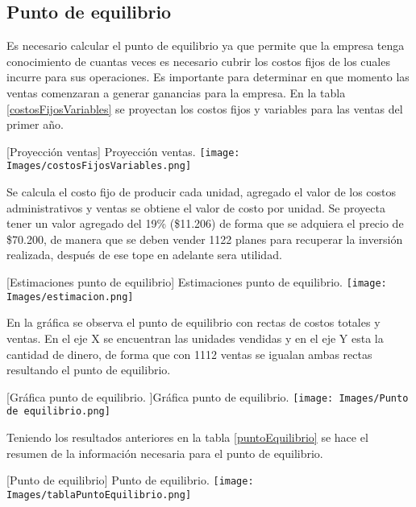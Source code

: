 \subsection{Punto de equilibrio}

Es necesario calcular el punto de equilibrio ya que permite que la empresa tenga conocimiento de cuantas veces es necesario cubrir los costos fijos de los cuales incurre para sus operaciones. Es importante para determinar en que momento las ventas comenzaran a generar ganancias para la empresa. En la tabla \ref{costosFijosVariables} se proyectan los costos fijos y variables para las ventas del primer año.

\vspace{2mm}
\begin{minipage}{0.9\textwidth}
\centering
{}[{Proyección ventas}]{ Proyección ventas. }
\label{costosFijosVariables}
\texttt{[image: Images/costosFijosVariables.png]}
\end{minipage}

Se calcula el costo fijo de producir cada unidad, agregado el valor de los costos administrativos y ventas se obtiene el valor de costo por unidad. Se proyecta tener un valor agregado del 19\% (\$11.206) de forma que se adquiera el precio de \$70.200, de manera que se deben vender 1122 planes para recuperar la inversión realizada, después de ese tope en adelante sera utilidad.   

\vspace{2mm}
\begin{minipage}{0.9\textwidth}
\centering
{}[{Estimaciones punto de equilibrio}]{ Estimaciones punto de equilibrio. }
\label{calculosPuntoEquilirbio}
\texttt{[image: Images/estimacion.png]}
\end{minipage}

En la gráfica se observa el punto de equilibrio con rectas de costos totales y ventas. En el eje X se encuentran las unidades vendidas y en el eje Y esta la cantidad de dinero, de forma que con 1112 ventas se igualan ambas rectas resultando el punto de equilibrio.

\vspace{2mm}
\begin{minipage}{0.9\textwidth}
\centering
{}[{Gráfica punto de equilibrio. }]{Gráfica punto de equilibrio. }
\label{graficaEquilibrio}
\texttt{[image: Images/Punto de equilibrio.png]}
\end{minipage}

Teniendo los resultados anteriores en la tabla \ref{puntoEquilibrio} se hace el resumen de la información necesaria para el punto de equilibrio.

\vspace{2mm}
\begin{minipage}{0.9\textwidth}
\centering
{}[{Punto de equilibrio}]{ Punto de equilibrio. }
\label{puntoEquilibrio}
\texttt{[image: Images/tablaPuntoEquilibrio.png]}
\end{minipage}